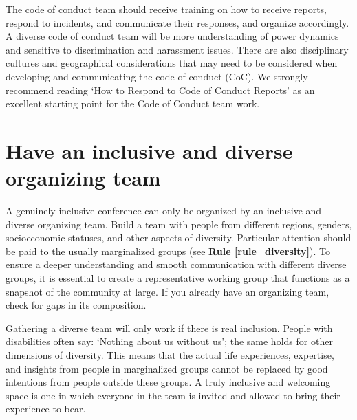 \documentclass[10pt,letterpaper]{article}
\begin{document}
The code of conduct team should receive training on how to receive reports, respond to incidents, and communicate their responses, and organize accordingly. A diverse code of conduct team will be more understanding of power dynamics and sensitive to discrimination and harassment issues. There are also disciplinary cultures and geographical considerations that may need to be considered when developing and communicating the code of conduct (CoC). We strongly recommend reading `How to Respond to Code of Conduct Reports' \cite{auroraHowRespondCode2019} as an excellent starting point for the Code of Conduct team work.


\section{Have an inclusive and diverse organizing team}
\label{rule_organizing_team}

A genuinely inclusive conference can only be organized by an inclusive and diverse organizing team. Build a team with people from different regions, genders, socioeconomic statuses, and other aspects of diversity. Particular attention should be paid to the usually marginalized groups (see \textbf{Rule \ref{rule_diversity}}). To ensure a deeper understanding and smooth communication with different diverse groups, it is essential to create a representative working group that functions as a snapshot of the community at large. If you already have an organizing team, check for gaps in its composition. 

Gathering a diverse team will only work if there is real inclusion. People with disabilities often say: `Nothing about us without us'; the same holds for other dimensions of diversity. This means that the actual life experiences, expertise, and insights from people in marginalized groups cannot be replaced by good intentions from people outside these groups. A truly inclusive and welcoming space is one in which everyone in the team is invited and allowed to bring their experience to bear. 
\end{document}

